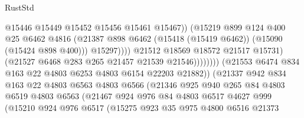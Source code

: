 \begin{lexlean}{RustStd}
\begin{coremodule}
                                                @15446
                                                @15449
                                                @15452
                                                @15456
                                                @15461
                                                @15467))
                                            (@15219
                                              @899
                                              @124
                                              @400
                                              @25
                                              @6462
                                              @4816
                                              (@21387
                                                @898
                                                @6462
                                                (@15418 (@15419 @6462))
                                                (@15090 (@15424 @898 @400)))
                                              @15297))))
                                      @21512
                                      @18569
                                      @18572
                                      @21517
                                      @15731)
                                    (@21527 @6468 @283 @265 @21457 @21539 @21546))))))))
                      (@21553 @6474 @834 @163 @22 @4803 @6253 @4803 @6154 @22203 @21882))
                    (@21337
                      @942
                      @834
                      @163
                      @22
                      @4803
                      @6563
                      @4803
                      @6566
                      (@21346
                        @925
                        @940
                        @265
                        @84
                        @4803
                        @6519
                        @4803
                        @6563
                        (@21467
                          @924
                          @976
                          @84
                          @4803
                          @6517
                          @4627
                          @999
                          (@15210
                            @924
                            @976
                            @6517
                            (@15275
                              @923
                              @35
                              @975
                              @4800
                              @6516
                              @21373

\end{coremodule}
\end{lexlean}
